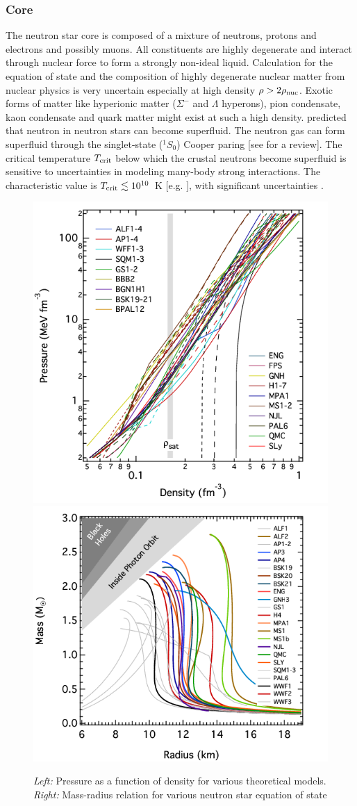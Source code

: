 \subsubsection{Core}
The neutron star core is composed of a mixture of neutrons, protons and electrons and possibly muons.
All constituents are highly degenerate and interact through nuclear force to form a strongly non-ideal liquid.
Calculation for the equation of state and the composition of highly degenerate nuclear matter from nuclear physics is very uncertain especially at high density $\rho>2\rho_{\rm nuc}$.
Exotic forms of matter like hyperionic matter ($\Sigma^-$ and $\Lambda$ hyperons), pion condensate, kaon condensate and quark matter might exist at such a high density.  
\citet{1959NucPh..13..655M} predicted that neutron in neutron stars can become superfluid.
The neutron gas can form superfluid through the singlet-state ($^1 S_0$) Cooper paring [see \citet{2003RvMP...75..607D} for a review].
The critical temperature $T_{\rm crit}$ below which the crustal neutrons become superfluid is sensitive to uncertainties in modeling many-body strong interactions. The characteristic value is $T_{\rm crit} \lesssim 10^{10}$~K [e.g. \citet{1999PhyU...42..737Y,2001LNP...578...30L}], with significant uncertainties \citep{2004ARA&A..42..169Y, 2009ApJ...707.1131P,2012MNRAS.422.2632H,2015PhRvC..91a5806H}.

%
\begin{figure}[h]
  \centering
  \includegraphics[height=0.4\textwidth]{pics/intro/eos.png}
  \includegraphics[height=0.4\textwidth]{pics/intro/mass-radius.png}
  \caption[Equation of state and mass-radius relation for neutron stars] {{\it Left:} Pressure as a function of density for various theoretical models. {\it Right:} Mass-radius relation for various neutron star equation of state \citep{2016ARA&A..54..401O}}
  \label{fig:NS-eos}
\end{figure}
%

